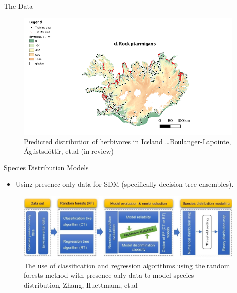 \documentclass[10pt]{beamer}
\begin{document}
\begin{frame}{The Data}
   \begin{center}
    \begin{figure}
        \includegraphics[width = \textwidth]{RockPtarmigan.png}
    \caption{Predicted distribution of herbivores in Iceland \dots Boulanger-Lapointe, Ágústsdóttir, et.al (in review)} 
\end{figure}
\end{center}
\end{frame}




\begin{frame}{Species Distribution Models}
    \begin{itemize}
        \item Using presence only data for SDM (specifically decision tree ensembles).
    \end{itemize}
    
    \begin{center}
        \begin{figure}
        \includegraphics[width = \textwidth]{Workflow.jpg}
        \caption{The use of classification and regression algorithms using the random forests method with presence-only data to model species distribution, Zhang, Huettmann, et.al }
    \end{figure}
    \end{center}
\end{frame}
\end{document}
